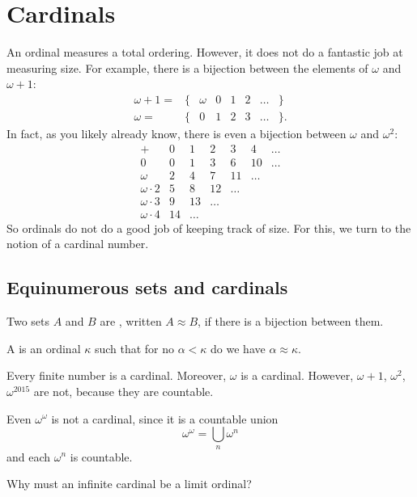 \chapter{Cardinals}
\label{ch:cardinals_set_theory}
An ordinal measures a total ordering.
However, it does not do a fantastic job at measuring size.
For example, there is a bijection between the elements of $\omega$ and $\omega+1$:
\[
	\begin{array}{rccccccc}
		\omega+1 = & \{ & \omega & 0 & 1 & 2 & \dots & \} \\
		\omega = & \{ & 0 & 1 & 2 & 3 & \dots & \}.
	\end{array}
\]
In fact, as you likely already know,
there is even a bijection between $\omega$ and $\omega^2$:
\[
	\begin{array}{l|cccccc}
		+ & 0 & 1 & 2 & 3 & 4 & \dots \\ \hline
		0 & 0 & 1 & 3 & 6 & 10 & \dots \\
		\omega & 2 & 4 & 7 & 11 & \dots & \\
		\omega \cdot 2 & 5 & 8 & 12 & \dots & & \\
		\omega \cdot 3 & 9 & 13 & \dots & & & \\
		\omega \cdot 4 & 14 & \dots & & & &
	\end{array}
\]
So ordinals do not do a good job of keeping track of size.
For this, we turn to the notion of a cardinal number.

\section{Equinumerous sets and cardinals}
\begin{definition}
	Two sets $A$ and $B$ are , written $A \approx B$,
	if there is a bijection between them.
\end{definition}

\begin{definition}
	A  is an ordinal $\kappa$ such that
	for no $\alpha < \kappa$ do we have $\alpha \approx \kappa$.
\end{definition}
\begin{example}
	Every finite number is a cardinal.
	Moreover, $\omega$ is a cardinal.
	However, $\omega+1$, $\omega^2$, $\omega^{2015}$ are not,
	because they are countable.
\end{example}
\begin{example}
	Even $\omega^\omega$ is not a cardinal,
	since it is a countable union
	\[ \omega^\omega = \bigcup_n \omega^n \]
	and each $\omega^n$ is countable.
\end{example}
\begin{ques}
	Why must an infinite cardinal be a limit ordinal?
\end{ques}

